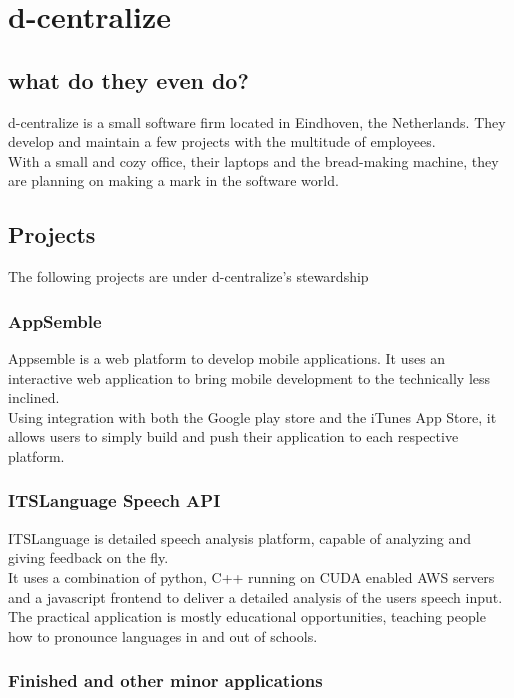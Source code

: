 \chapter{d-centralize}
\section{what do they even do?}
d-centralize is a small software firm located in Eindhoven, the Netherlands. They develop and maintain a few projects with the multitude of employees. \\

With a small and cozy office, their laptops and the bread-making machine, they are planning on making a mark in the software world. \cite{dcent1}

\section{Projects}

The following projects are under d-centralize's stewardship

\subsection{AppSemble}
Appsemble is a web platform to develop mobile applications. It uses an interactive web application to bring mobile development to the technically less inclined. \cite{dcent1} \\

Using integration with both the Google play store and the iTunes App Store, it allows users to simply build and push their application to each respective platform.

\subsection{ITSLanguage Speech API}
ITSLanguage is detailed speech analysis platform, capable of analyzing and giving feedback on the fly. \\

It uses a combination of python, C++ running on CUDA enabled AWS servers and a javascript frontend to deliver a detailed analysis of the users speech input. \\

The practical application is mostly educational opportunities, teaching people how to pronounce languages in and out of schools.

\subsection{Finished and other minor applications}

